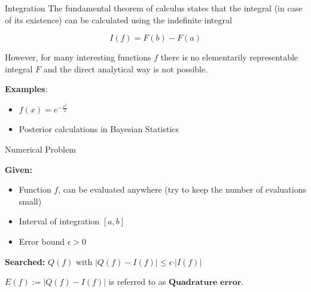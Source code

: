 \documentclass[11pt,compress,t,notes=noshow, xcolor=table]{beamer}
\begin{document}
\begin{vbframe}{Integration}
The fundamental theorem of calculus states that the integral (in case of its existence) can be calculated using the indefinite integral

$$
I(f) = F(b) - F(a)
$$

However, for many interesting functions $f$ there is no elementarily representable integral $F$ and the direct analytical way is not possible.

\lz

\vspace*{-0.4cm}
\textbf{Examples}:
\begin{itemize}
\item $f(x)=e^{-\frac{x^2}2}$
\item Posterior calculations in Bayesian Statistics
\end{itemize}
\end{vbframe}



\begin{vbframe}{Numerical Problem}

\textbf{Given:}
\begin{itemize}
\item Function $f$, can be evaluated anywhere (try to keep the number of evaluations small)
\item Interval of integration $[a, b]$
\item Error bound $\epsilon > 0$
\end{itemize}

\lz

\textbf{Searched:} $Q(f)$ with $\vert Q(f) - I(f) \vert \le \epsilon \cdot \vert I(f) \vert$

\lz

$E(f) := |Q(f) - I(f)|$ is referred to as $\textbf{Quadrature error}$.

%
\end{vbframe}
\end{document}
